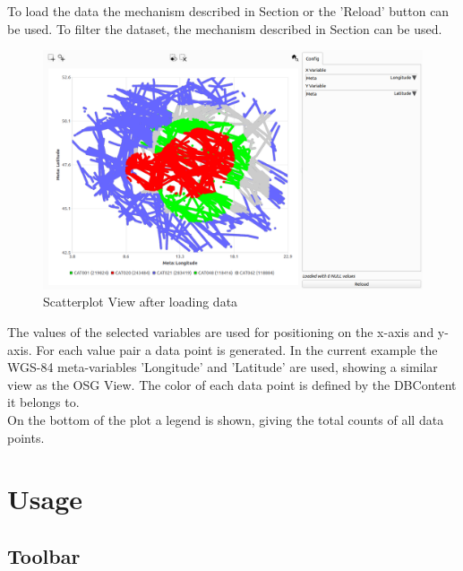 To load the data the mechanism described in Section  or the 'Reload' button can be used. To filter the dataset, the mechanism described in Section  can be used. \\

\begin{figure}[H]
    \hspace*{-2cm}
    \includegraphics[width=18cm,frame]{figures/scatter_loaded.png}
  \caption{Scatterplot View after loading data}
\end{figure}

The values of the selected variables are used for positioning on the x-axis and y-axis. For each value pair a data point is generated. 
In the current example the WGS-84 meta-variables 'Longitude' and 'Latitude' are used, showing a similar view as the OSG View.
The color of each data point is defined by the DBContent it belongs to.\\


On the bottom of the plot a legend is shown, giving the total counts of all data points.

\section{Usage}

\subsection{Toolbar}

